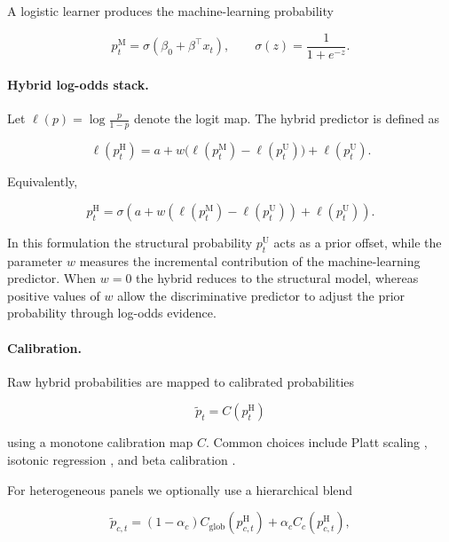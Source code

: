 \documentclass[a4paper,fleqn]{cas-dc}
\begin{document}
	A logistic learner produces the machine-learning probability
	
	\begin{equation}
		p_t^{\mathrm{M}}=\sigma(\beta_0+\beta^\top x_t), \qquad
		\sigma(z)=\frac{1}{1+e^{-z}}.
	\end{equation}
	
	\paragraph{Hybrid log-odds stack.}
	
	Let $\ell(p)=\log\frac{p}{1-p}$ denote the logit map. The hybrid predictor is defined as
	
	\begin{equation}
		\ell(p_t^{\mathrm{H}})
		=
		a+w\bigl(\ell(p_t^{\mathrm{M}})-\ell(p_t^{\mathrm{U}})\bigr)
		+\ell(p_t^{\mathrm{U}}).
	\end{equation}
	
	Equivalently,
	
	\begin{equation}
		p_t^{\mathrm{H}}
		=
		\sigma
		\left(
		a+w(\ell(p_t^{\mathrm{M}})-\ell(p_t^{\mathrm{U}}))
		+\ell(p_t^{\mathrm{U}})
		\right).
	\end{equation}
	
	In this formulation the structural probability $p_t^{\mathrm{U}}$ acts as a prior offset, while the parameter $w$ measures the incremental contribution of the machine-learning predictor. When $w=0$ the hybrid reduces to the structural model, whereas positive values of $w$ allow the discriminative predictor to adjust the prior probability through log-odds evidence.
	
	\paragraph{Calibration.}
	
	Raw hybrid probabilities are mapped to calibrated probabilities
	
	\[
	\tilde p_t = C(p_t^{\mathrm{H}})
	\]
	
	using a monotone calibration map $C$. Common choices include Platt scaling \citep{Platt1999}, isotonic regression \citep{ZadroznyElkan2002,NiculescuMizilCaruana2005}, and beta calibration \citep{KullEtAl2017}.
	
	For heterogeneous panels we optionally use a hierarchical blend
	
	\begin{equation}
		\tilde p_{c,t}
		=
		(1-\alpha_c)C_{\mathrm{glob}}(p_{c,t}^{\mathrm{H}})
		+
		\alpha_c C_c(p_{c,t}^{\mathrm{H}}),
	\end{equation}
	
\end{document}
